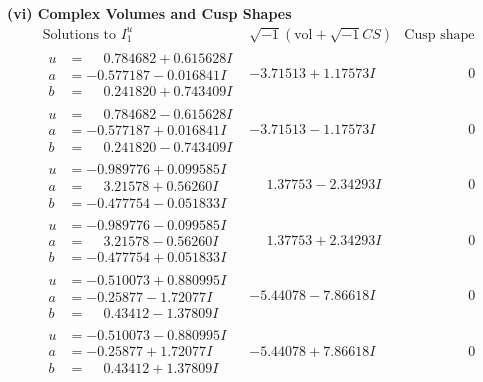 \documentclass[1p]{elsarticle_modified}
\theoremstyle{definition}
\newcommand{\I}{\sqrt{-1}}
\begin{document}
\newpage\flushleft \textbf{(vi) Complex Volumes and Cusp Shapes}
$$\begin{array}{c|c|c}  
\text{Solutions to }I^u_{1}& \I (\text{vol} + \sqrt{-1}CS) & \text{Cusp shape}\\
 \hline 
\begin{aligned}
u &= \phantom{-}0.784682 + 0.615628 I \\
a &= -0.577187 - 0.016841 I \\
b &= \phantom{-}0.241820 + 0.743409 I\end{aligned}
 & -3.71513 + 1.17573 I & \phantom{-0.000000 } 0 \\ \hline\begin{aligned}
u &= \phantom{-}0.784682 - 0.615628 I \\
a &= -0.577187 + 0.016841 I \\
b &= \phantom{-}0.241820 - 0.743409 I\end{aligned}
 & -3.71513 - 1.17573 I & \phantom{-0.000000 } 0 \\ \hline\begin{aligned}
u &= -0.989776 + 0.099585 I \\
a &= \phantom{-}3.21578 + 0.56260 I \\
b &= -0.477754 - 0.051833 I\end{aligned}
 & \phantom{-}1.37753 - 2.34293 I & \phantom{-0.000000 } 0 \\ \hline\begin{aligned}
u &= -0.989776 - 0.099585 I \\
a &= \phantom{-}3.21578 - 0.56260 I \\
b &= -0.477754 + 0.051833 I\end{aligned}
 & \phantom{-}1.37753 + 2.34293 I & \phantom{-0.000000 } 0 \\ \hline\begin{aligned}
u &= -0.510073 + 0.880995 I \\
a &= -0.25877 - 1.72077 I \\
b &= \phantom{-}0.43412 - 1.37809 I\end{aligned}
 & -5.44078 - 7.86618 I & \phantom{-0.000000 } 0 \\ \hline\begin{aligned}
u &= -0.510073 - 0.880995 I \\
a &= -0.25877 + 1.72077 I \\
b &= \phantom{-}0.43412 + 1.37809 I\end{aligned}
 & -5.44078 + 7.86618 I & \phantom{-0.000000 } 0 \\ \hline\begin{aligned}

\end{aligned}
\end{array}$$
\end{document}
